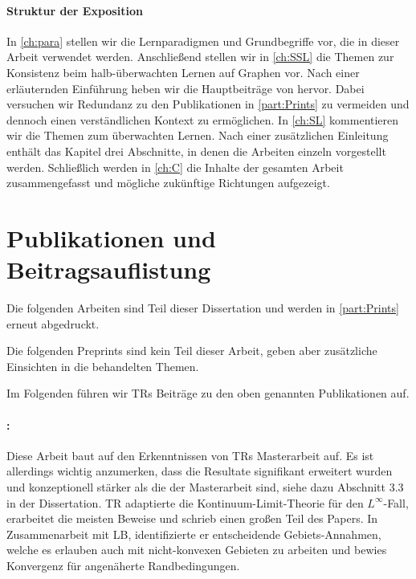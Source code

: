 \paragraph{Struktur der Exposition} In \cref{ch:para} stellen wir die Lernparadigmen und Grundbegriffe vor, die in dieser Arbeit verwendet werden. Anschlie\ss{}end stellen wir in \cref{ch:SSL} die Themen zur Konsistenz beim halb-überwachten Lernen auf Graphen vor. Nach einer erläuternden Einführung heben wir die Hauptbeiträge von \cite{roith2022continuum,bungert2021uniform} hervor. Dabei versuchen wir Redundanz zu den Publikationen in \cref{part:Prints} zu vermeiden und dennoch einen verständlichen Kontext zu ermöglichen. In \cref{ch:SL} kommentieren wir die Themen zum überwachten Lernen. Nach einer zusätzlichen Einleitung enthält das Kapitel drei Abschnitte, in denen die Arbeiten \cite{kabri2023resolution,bungert2021clip,bungert2022bregman} einzeln vorgestellt werden. Schlie\ss{}lich werden in \cref{ch:C} die Inhalte der gesamten Arbeit zusammengefasst und mögliche zukünftige Richtungen aufgezeigt.
%
%
%
%
%
\section*{Publikationen und Beitragsauflistung}
Die folgenden Arbeiten sind Teil dieser Dissertation und werden in \cref{part:Prints} erneut abgedruckt.

\printbibliography[keyword={papersA}, resetnumbers=true, heading=none]
\printbibliography[keyword={papersB}, resetnumbers=true, heading=none]

\noindent%
Die folgenden Preprints sind kein Teil dieser Arbeit, geben aber zusätzliche Einsichten in die behandelten Themen.

\printbibliography[keyword={papersC}, resetnumbers=true, heading=none]

Im Folgenden führen wir TRs Beiträge zu den oben genannten Publikationen auf. 

\paragraph{\cite{roith2022continuum}:} Diese Arbeit baut auf den Erkenntnissen von TRs Masterarbeit auf. Es ist allerdings wichtig anzumerken, dass die Resultate signifikant erweitert wurden und konzeptionell stärker als die der Masterarbeit sind, siehe dazu Abschnitt 3.3 in der Dissertation. TR adaptierte die Kontinuum-Limit-Theorie für den $L^\infty$-Fall, erarbeitet die meisten Beweise und schrieb einen gro\ss{}en Teil des Papers. In Zusammenarbeit mit LB, identifizierte er entscheidende Gebiets-Annahmen, welche es erlauben auch mit nicht-konvexen Gebieten zu arbeiten und bewies Konvergenz für angenäherte Randbedingungen.

